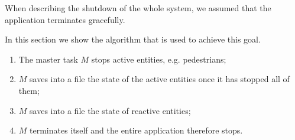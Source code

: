 When describing the shutdown of the whole system, we assumed that the
application terminates gracefully.

In this section we show the algorithm that is used to achieve this goal.

\begin{enumerate}
  \item The master task $M$ stops active entities, e.g. pedestrians;
  \item $M$ saves into a file the state of the active entities once it has
    stopped all of them;
  \item $M$ saves into a file the state of reactive entities;
  \item $M$ terminates itself and the entire application therefore stops.
\end{enumerate}

